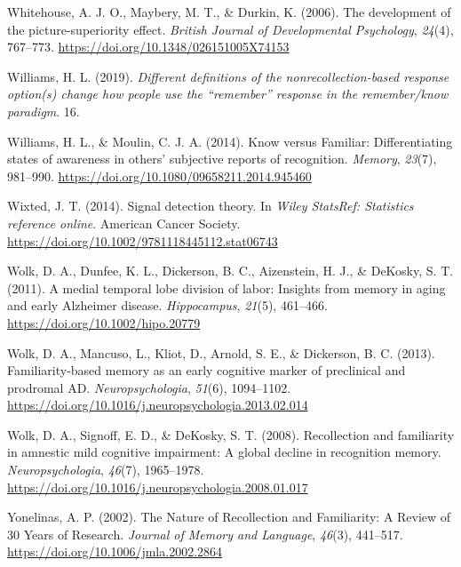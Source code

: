 \documentclass[
  11pt,
]{article}
\begin{document}
\leavevmode\hypertarget{ref-whitehouse2006}{}%
Whitehouse, A. J. O., Maybery, M. T., \& Durkin, K. (2006). The
development of the picture-superiority effect. \emph{British Journal of
Developmental Psychology}, \emph{24}(4), 767--773.
\url{https://doi.org/10.1348/026151005X74153}

\leavevmode\hypertarget{ref-williams2019}{}%
Williams, H. L. (2019). \emph{Different definitions of the
nonrecollection-based response option(s) change how people use the
``remember'' response in the remember/know paradigm}. 16.

\leavevmode\hypertarget{ref-williams2014}{}%
Williams, H. L., \& Moulin, C. J. A. (2014). Know versus Familiar:
Differentiating states of awareness in others' subjective reports of
recognition. \emph{Memory}, \emph{23}(7), 981--990.
\url{https://doi.org/10.1080/09658211.2014.945460}

\leavevmode\hypertarget{ref-doi:https:ux2fux2fdoi.orgux2f10.1002ux2f9781118445112.stat06743}{}%
Wixted, J. T. (2014). Signal detection theory. In \emph{Wiley StatsRef:
Statistics reference online}. American Cancer Society.
\url{https://doi.org/10.1002/9781118445112.stat06743}

\leavevmode\hypertarget{ref-wolk2011}{}%
Wolk, D. A., Dunfee, K. L., Dickerson, B. C., Aizenstein, H. J., \&
DeKosky, S. T. (2011). A medial temporal lobe division of labor:
Insights from memory in aging and early Alzheimer disease.
\emph{Hippocampus}, \emph{21}(5), 461--466.
\url{https://doi.org/10.1002/hipo.20779}

\leavevmode\hypertarget{ref-wolk2013}{}%
Wolk, D. A., Mancuso, L., Kliot, D., Arnold, S. E., \& Dickerson, B. C.
(2013). Familiarity-based memory as an early cognitive marker of
preclinical and prodromal AD. \emph{Neuropsychologia}, \emph{51}(6),
1094--1102. \url{https://doi.org/10.1016/j.neuropsychologia.2013.02.014}

\leavevmode\hypertarget{ref-wolk2008}{}%
Wolk, D. A., Signoff, E. D., \& DeKosky, S. T. (2008). Recollection and
familiarity in amnestic mild cognitive impairment: A global decline in
recognition memory. \emph{Neuropsychologia}, \emph{46}(7), 1965--1978.
\url{https://doi.org/10.1016/j.neuropsychologia.2008.01.017}

\leavevmode\hypertarget{ref-yonelinas2002}{}%
Yonelinas, A. P. (2002). The Nature of Recollection and Familiarity: A
Review of 30 Years of Research. \emph{Journal of Memory and Language},
\emph{46}(3), 441--517. \url{https://doi.org/10.1006/jmla.2002.2864}
\end{document}
